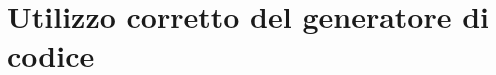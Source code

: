 \chapter{Utilizzo corretto del generatore di codice}\label{cap:RegoleEConvenzioni}
\rhead[]{\fancyplain{}{\footnotesize{\leftmark}}}
\lfoot[\fancyplain{}{\bf \thepage}]{}
\cfoot[]{} %
\rfoot[]{\fancyplain{}{\bf \thepage}}
